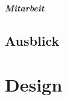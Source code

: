 \documentclass[
ngerman,
paper=a4,
asymmetric,
fontsize=10pt,
draft=false,
numbers=noenddot,
bibtotocnumbered,
footnotes=multiple,
toc=flat,
]{scrbook}
\begin{document}
\paragraph{Mitarbeit}

% 
% 
% 
% 



\section{Ausblick}






\chapter{Design}
\end{document}
